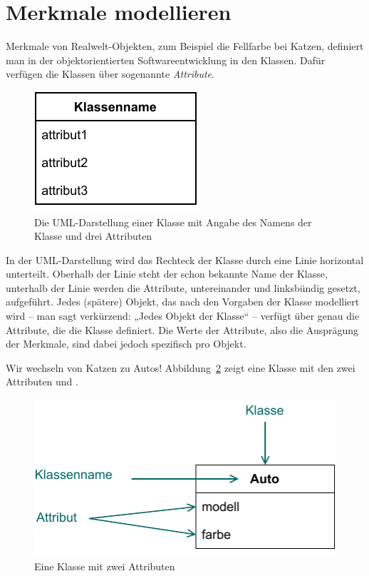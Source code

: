\section{Merkmale modellieren}
\label{sec:Kap-4.2}

Merkmale von Realwelt-Objekten, zum Beispiel die Fellfarbe bei Katzen, definiert man in der objektorientierten Softwareentwicklung in den Klassen. Dafür verfügen die Klassen über sogenannte \textit{Attribute}.

\vspace{2mm} %

\begin{figure}[h!]
	\centering
	\includegraphics{Bilder/Kapitel-4/darstellung_klasse_mit_drei_attributen.pdf}
	\caption[Die UML-Darstellung einer Klasse]{Die UML-Darstellung einer Klasse mit Angabe des Namens der \mbox{Klasse} und drei Attributen}
	\label{fig:darstellung_klasse_mit_drei_attributen}
\end{figure}

In der UML-Darstellung wird das Rechteck der Klasse durch eine Linie horizontal unterteilt. Oberhalb der Linie steht der schon bekannte Name der Klasse, unterhalb der Linie werden die Attribute, untereinander und linksbündig gesetzt, aufgeführt. Jedes (spätere) Objekt, das nach den Vorgaben der Klasse modelliert wird – man sagt verkürzend: „Jedes Objekt der Klasse“ – verfügt über genau die Attribute, die die Klasse definiert. Die Werte der Attribute, also die Ausprägung der Merkmale, sind dabei jedoch spezifisch pro Objekt.

Wir wechseln von Katzen zu Autos! Abbildung~\ref{fig:klasse_auto_mit_zwei_attributen} zeigt eine Klasse  mit den zwei Attributen  und .

\begin{figure}[h!]
	\centering
	\includegraphics{Bilder/Kapitel-4/klasse_auto_mit_zwei_attributen.pdf}
	\caption{Eine Klasse  mit zwei Attributen}
	\label{fig:klasse_auto_mit_zwei_attributen}
\end{figure}

